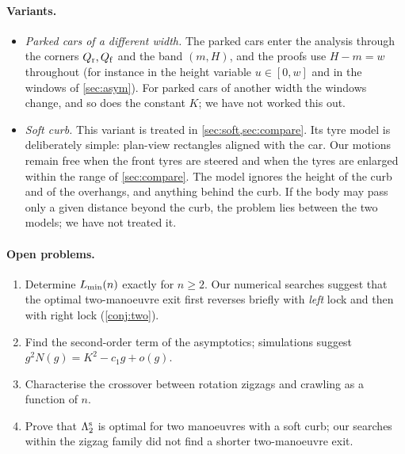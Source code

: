 \paragraph{Variants.}
\begin{itemize}[nosep]
\item \emph{Parked cars of a different width.} The parked cars enter the analysis through the corners $Q_{\mathrm r},Q_{\mathrm f}$ and the band $(m,H)$, and the proofs use $H-m=w$ throughout (for instance in the height variable $u\in[0,w]$ and in the windows of \cref{sec:asym}).
For parked cars of another width the windows change, and so does the constant $K$; we have not worked this out.
\item \emph{Soft curb.} This variant is treated in \cref{sec:soft,sec:compare}.
Its tyre model is deliberately simple: plan-view rectangles aligned with the car.
Our motions remain free when the front tyres are steered and when the tyres are enlarged within the range of \cref{sec:compare}.
The model ignores the height of the curb and of the overhangs, and anything behind the curb.
If the body may pass only a given distance beyond the curb, the problem lies between the two models; we have not treated it.
\end{itemize}

\paragraph{Open problems.}
\begin{enumerate}[nosep]
\item Determine $L_{\min}(n)$ exactly for $n\ge2$.
Our numerical searches suggest that the optimal two-manoeuvre exit first reverses briefly with \emph{left} lock and then with right lock (\cref{conj:two}).
\item Find the second-order term of the asymptotics; simulations suggest $g^2N(g)=K^2-c_1g+o(g)$.
\item Characterise the crossover between rotation zigzags and crawling as a function of $n$.
\item Prove that $\Lambda_2^{\rm s}$ is optimal for two manoeuvres with a soft curb; our searches within the zigzag family did not find a shorter two-manoeuvre exit.
\end{enumerate}
